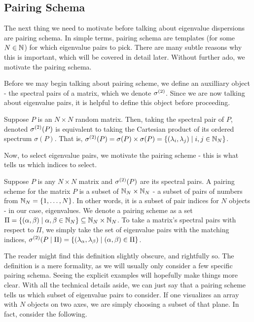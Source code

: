 
\subsection{Pairing Schema}

The next thing we need to motivate before talking about eigenvalue dispersions are pairing schema. In simple terms, pairing schema are templates (for some $N \in \mathbb{N}$) for which eigenvalue pairs to pick. There are many subtle reasons why this is important, which will be covered in detail later. Without further ado, we motivate the pairing schema.

Before we may begin talking about pairing scheme, we define an auxilliary object - the spectral pairs of a matrix, which we denote ${\sigma^{(2)}}$. Since we are now talking about eigenvalue pairs, it is helpful to define this object before proceeding.

\begin{definition}
Suppose $P$ is an $N \times N$ random matrix. Then, taking the spectral pair of $P$, denoted ${\sigma^{(2)}}(P)$ is equivalent to taking the Cartesian product of its ordered spectrum $\sigma(P)$. That is, ${\sigma^{(2)}}(P) = \sigma(P) \times \sigma(P) = \{(\lambda_i, \lambda_j) \mid i,j \in \mathbb{N}_N\}$.
\end{definition}

Now, to select eigenvalue pairs, we motivate the pairing scheme - this is what tells us which indices to select.

\begin{definition}
Suppose $P$ is any $N \times N$ matrix and ${\sigma^{(2)}}(P)$ are its spectral pairs. A pairing scheme for the matrix $P$ is a subset of $\mathbb{N}_N \times \mathbb{N}_N$ - a subset of pairs of numbers from $\mathbb{N}_N = \{1, \dots, N\}$. In other words, it is a subset of pair indices for $N$ objects - in our case, eigenvalues. We denote a pairing scheme as a set $\Pi = \{(\alpha, \beta) \mid \alpha, \beta \in \mathbb{N}_N\} \subseteq \mathbb{N}_N \times \mathbb{N}_N$. To take a matrix's spectral pairs with respect to $\Pi$, we simply take the set of eigenvalue pairs with the matching indices, ${\sigma^{(2)}}(P \mid \Pi) = \{(\lambda_{\alpha},\lambda_{\beta}) \mid ({\alpha},{\beta}) \in \Pi\}$.
\end{definition}

The reader might find this definition slightly obscure, and rightfully so. The definition is a mere formality, as we will usually only consider a few specific pairing schema. Seeing the explicit examples will hopefully make things more clear. With all the technical details aside, we can just say that a pairing scheme tells us which subset of eigenvalue pairs to consider. If one visualizes an array with $N$ objects on two axes, we are simply choosing a subset of that plane. In fact, consider the following.


